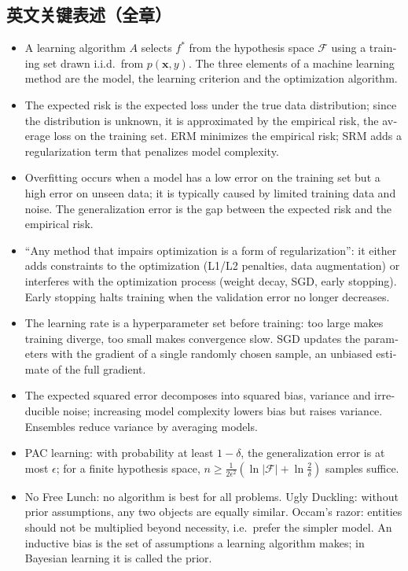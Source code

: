 \subsection{英文关键表述（全章）}
\begin{english}
\begin{itemize}\setlength{\itemsep}{0pt}
\item A learning algorithm $A$ selects $f^*$ from the hypothesis space $\mathcal F$ using a training set drawn i.i.d.\ from $p(\bm x,y)$. The three elements of a machine learning method are the model, the learning criterion and the optimization algorithm.
\item The expected risk is the expected loss under the true data distribution; since the distribution is unknown, it is approximated by the empirical risk, the average loss on the training set. ERM minimizes the empirical risk; SRM adds a regularization term that penalizes model complexity.
\item Overfitting occurs when a model has a low error on the training set but a high error on unseen data; it is typically caused by limited training data and noise. The generalization error is the gap between the expected risk and the empirical risk.
\item ``Any method that impairs optimization is a form of regularization'': it either adds constraints to the optimization (L1/L2 penalties, data augmentation) or interferes with the optimization process (weight decay, SGD, early stopping). Early stopping halts training when the validation error no longer decreases.
\item The learning rate is a hyperparameter set before training: too large makes training diverge, too small makes convergence slow. SGD updates the parameters with the gradient of a single randomly chosen sample, an unbiased estimate of the full gradient.
\item The expected squared error decomposes into squared bias, variance and irreducible noise; increasing model complexity lowers bias but raises variance. Ensembles reduce variance by averaging models.
\item PAC learning: with probability at least $1-\delta$, the generalization error is at most $\epsilon$; for a finite hypothesis space, $n\ge\frac{1}{2\epsilon^2}(\ln|\mathcal F|+\ln\frac2\delta)$ samples suffice.
\item No Free Lunch: no algorithm is best for all problems. Ugly Duckling: without prior assumptions, any two objects are equally similar. Occam's razor: entities should not be multiplied beyond necessity, i.e.\ prefer the simpler model. An inductive bias is the set of assumptions a learning algorithm makes; in Bayesian learning it is called the prior.
\end{itemize}
\end{english}
